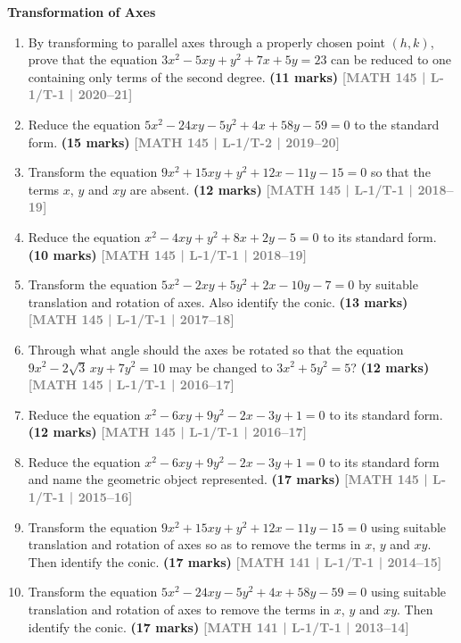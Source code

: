 \documentclass[12pt,a4paper]{article}
\newcommand{\yr}[1]{\hfill\textcolor{gray}{\small\textbf{[#1]}}}
\newcommand{\mk}[1]{\textcolor{orange!70!black}{\small\textbf{(#1 marks)}}}
\newcommand{\subtopic}[2]{%
  \vspace{10pt}
  \noindent\begin{tcolorbox}[colback=#1!8,colframe=#1,boxrule=0.6pt,arc=4pt,
    left=6pt,right=6pt,top=4pt,bottom=4pt]
    \small\bfseries\textcolor{#1}{#2}
  \end{tcolorbox}
  \vspace{2pt}
}
\begin{document}
\subtopic{cH}{Transformation of Axes}
\label{sub:s10-transform}

\begin{enumerate}\item By transforming to parallel axes through a properly chosen point $(h,k)$, prove that the equation $3x^{2}-5xy+y^{2}+7x+5y=23$ can be reduced to one containing only terms of the second degree.
\mk{11} \yr{MATH 145 | L-1/T-1 | 2020--21}



\item Reduce the equation $5x^{2}-24xy-5y^{2}+4x+58y-59=0$ to the standard form.
\mk{15} \yr{MATH 145 | L-1/T-2 | 2019--20}

\item Transform the equation $9x^{2}+15xy+y^{2}+12x-11y-15=0$ so that the terms $x$, $y$ and $xy$ are absent.
\mk{12} \yr{MATH 145 | L-1/T-1 | 2018--19}

\item Reduce the equation $x^{2}-4xy+y^{2}+8x+2y-5=0$ to its standard form.
\mk{10} \yr{MATH 145 | L-1/T-1 | 2018--19}

\item Transform the equation $5x^{2}-2xy+5y^{2}+2x-10y-7=0$ by suitable translation and rotation of axes. Also identify the conic.
\mk{13} \yr{MATH 145 | L-1/T-1 | 2017--18}

\item Through what angle should the axes be rotated so that the equation $9x^{2}-2\sqrt{3}\,xy+7y^{2}=10$ may be changed to $3x^{2}+5y^{2}=5$?
\mk{12} \yr{MATH 145 | L-1/T-1 | 2016--17}

\item Reduce the equation $x^{2}-6xy+9y^{2}-2x-3y+1=0$ to its standard form.
\mk{12} \yr{MATH 145 | L-1/T-1 | 2016--17}

\item Reduce the equation $x^{2}-6xy+9y^{2}-2x-3y+1=0$ to its standard form and name the geometric object represented.
\mk{17} \yr{MATH 145 | L-1/T-1 | 2015--16}

\item Transform the equation $9x^{2}+15xy+y^{2}+12x-11y-15=0$ using suitable translation and rotation of axes so as to remove the terms in $x$, $y$ and $xy$. Then identify the conic.
\mk{17} \yr{MATH 141 | L-1/T-1 | 2014--15}

\item Transform the equation $5x^{2}-24xy-5y^{2}+4x+58y-59=0$ using suitable translation and rotation of axes to remove the terms in $x$, $y$ and $xy$. Then identify the conic.
\mk{17} \yr{MATH 141 | L-1/T-1 | 2013--14}


\end{enumerate}
\end{document}
